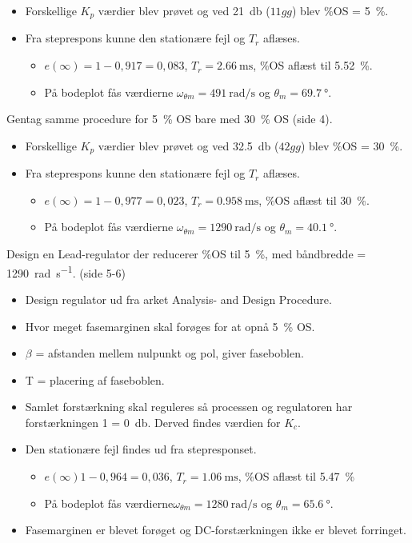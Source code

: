 \documentclass[danish]{article}
\begin{document}
\begin{itemize}
	\item Forskellige $K_p$ værdier blev prøvet og ved \SI{21}{\decibel} ($11gg$) blev $\si{\percent}$OS = \SI{5}{\percent}.
	\item Fra steprespons kunne den stationære fejl og $T_r$ aflæses. 
	\begin{itemize}
		\item $e(\infty) = 1-0,917 = 0,083$, $T_r = \SI{2,66}{\milli\second}$, $\si{\percent}$OS aflæst til \SI{5,52}{\percent}.
		\item På bodeplot fås værdierne $\omega_{\theta m} = \SI{491}{\radian\per\second}$ og $\theta_m = \SI{69,7}{\degree}$.
	\end{itemize}
\end{itemize}
\vspace{3mm}
Gentag samme procedure for \SI{5}{\percent} OS bare med \SI{30}{\percent} OS (side 4).
\begin{itemize}
	\item Forskellige $K_p$ værdier blev prøvet og ved \SI{32,5}{\decibel} ($42gg$) blev $\si{\percent}$OS = \SI{30}{\percent}.
	\item Fra steprespons kunne den stationære fejl og $T_r$ aflæses.	
\begin{itemize}
	\item $e(\infty) = 1-0,977 = 0,023$, $T_r = \SI{0,958}{\milli\second}$, $\si{\percent}$OS aflæst til \SI{30}{\percent}.
	\item På bodeplot fås værdierne $\omega_{\theta m} = \SI{1290}{\radian\per\second}$ og $\theta_m = \SI{40,1}{\degree}$.
\end{itemize}
\end{itemize}
\vspace{3mm}
Design en Lead-regulator der reducerer $\si{\percent}$OS til \SI{5}{\percent}, med båndbredde = \SI{1290}{\radian\per\second}. (side 5-6)
\begin{itemize}
	\item Design regulator ud fra arket Analysis- and Design Procedure.
	\item Hvor meget fasemarginen skal forøges for at opnå \SI{5}{\percent} OS.
	\item $\beta$ = afstanden mellem nulpunkt og pol, giver faseboblen.
	\item T = placering af faseboblen.
	\item Samlet forstærkning skal reguleres så processen og regulatoren har forstærkningen 1 = \SI{0}{\decibel}. Derved findes værdien for $K_c$.
	\item Den stationære fejl findes ud fra stepresponset.
	\begin{itemize}
		\item  $e(\infty) 1-0,964=0,036$, $T_r = \SI{1,06}{\milli\second}$, $\si{\percent}$OS aflæst til \SI{5,47}{\percent}
		\item På bodeplot fås værdierne$\omega_{\theta m} = \SI{1280}{\radian\per\second}$  og  $\theta_m = \SI{65,6}{\degree}$.
	\end{itemize}
	\item Fasemarginen er blevet forøget og
	DC-forstærkningen ikke er blevet forringet.
\end{itemize}
\end{document}
